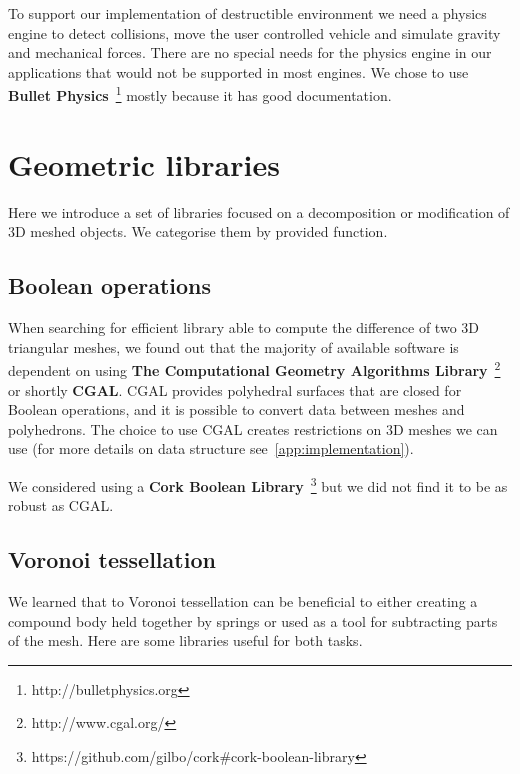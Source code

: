 To support our implementation of destructible environment we need a physics engine to detect collisions, move the user controlled vehicle and simulate gravity and mechanical forces. There are no special needs for the physics engine in our applications that would not be supported in most engines. We chose to use \textbf{Bullet Physics}~\footnote{http://bulletphysics.org} mostly because it has good documentation.

\section{Geometric libraries}
Here we introduce a set of libraries focused on a decomposition or modification of 3D meshed objects. We categorise them by provided function.

\subsection{Boolean operations}
When searching for efficient library able to compute the difference of two 3D triangular meshes, we found out that the majority of available software is dependent on using \textbf{The Computational Geometry Algorithms Library}~\footnote{http://www.cgal.org/} or shortly \textbf{CGAL}. CGAL provides polyhedral surfaces that are closed for Boolean operations, and it is possible to convert data between meshes and polyhedrons. The choice to use CGAL creates restrictions on 3D meshes we can use (for more details on data structure see~\cref{app:implementation}).

We considered using a \textbf{Cork Boolean Library}~\footnote{https://github.com/gilbo/cork\#cork-boolean-library} but we did not find it to be as robust as CGAL.

\subsection{Voronoi tessellation}
We learned that to Voronoi tessellation can be beneficial to either creating a compound body held together by springs or used as a tool for subtracting parts of the mesh. Here are some libraries useful for both tasks.

